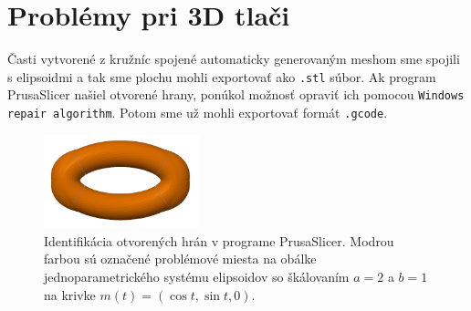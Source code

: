 \section{Problémy pri 3D tlači}
Časti vytvorené z kružníc spojené automaticky generovaným meshom sme spojili s elipsoidmi a tak sme plochu mohli exportovať ako \verb|.stl| súbor. Ak program PrusaSlicer našiel otvorené hrany, ponúkol možnosť opraviť ich pomocou \verb|Windows repair algorithm|. Potom sme už mohli exportovať formát \verb|.gcode|. 
\begin{figure}[h]
	\centering
	\includegraphics[width=0.4\textwidth]{images/otvorene_hrany2.png}
	\caption[Otvorené hrany.]{Identifikácia otvorených hrán v programe PrusaSlicer. Modrou farbou sú označené problémové miesta na obálke jednoparametrického systému elipsoidov so škálovaním $a = 2$ a $b =1$ na krivke $m(t) = (\cos t, \sin t, 0) $.}
	\label{fig:open_edges}
\end{figure}

